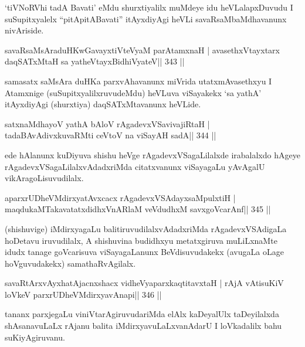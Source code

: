 \begin{artha}
`tiVNoRVhi tadA Bavati' eMdu shurxtiyalilx muMdeye idu heVLalapxDuvudu I suSupitxyalelx ``pitA\s pitABavati'' itAyxdiyAgi heVLi savaRsaMbaMdhavanunx nivAriside.
\end{artha}

\begin{shl}
savaRsaMsAraduHKwGavayxtiVteVyaM parA\s\s tamxnaH |
avasethxVtayxtarx daqSATxMtaH sa yatheVtayxBidhiVyateV\hfill || 343 ||
\end{shl}

\begin{artha}
samasatx saMsAra duHKa parxvAhavanunx miVrida utatxmAvasethxyu I  Atamxnige (suSupitxyalilxruvudeMdu) heVLuva viSayakekx `sa yathA' itAyxdiyAgi (shurxtiya) daqSATxMtavanunx heVLide.
\end{artha}

\begin{shl}
satxnaMdhayoV yathA bAloV rAgadevxVSavivajiRtaH |
tadaBAvAdivxkuvaRMti ceVtoV na viSayAH sadA\hfill || 344 ||
\end{shl}

\begin{artha}
ede hAlanunx kuDiyuva shishu heVge rAgadevxVSagaLilalxde irabalalxdo hAgeye rAgadevxVSagaLilalxvAdadxriMda citatxvanunx viSayagaLu yAvAgalU vikAragoLisuvudilalx.
\end{artha}

\begin{shl}
aparxrUDheVMdirxyatAvxcacx rAgadevxVSAdayxsaMpulxtiH |
maqdukaMTakavatatxdidhxVnARlaM veVdudhxM savxgoVcarAnf\hfill || 345 ||
\end{shl}

\begin{artha}
(shishuvige) iMdirxyagaLu balitiruvudilalxvAdadxriMda rAgadevxVSAdigaLa hoDetavu iruvudilalx, A shishuvina budidhxyu metatxgiruva muLiLxnaMte idudx tanage goVcarisuva viSayagaLanunx BeVdisuvudakekx (avugaLa oLage hoVguvudakekx) samathaRvAgilalx.
\end{artha}


\begin{shl}
savaRtArxvAyxhatAjacnxshacx vidheVyaparxkaqtitavxtaH |
rAjA vA\s tisuKiV loVkeV parxrUDheVMdirxyavAnapi\hfill || 346 ||
\end{shl}

\begin{artha}
tananx parxjegaLu viniVtarAgiruvudariMda elAlx kaDeyalUlx taDeyilalxda shAsanavuLaLx rAjanu balita iMdirxyavuLaLxvanAdarU I loVkadalilx bahu suKiyAgiruvanu.
\end{artha}

